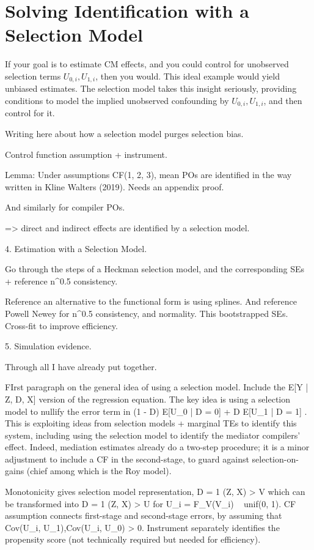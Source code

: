 \section{Solving Identification with a Selection Model}
\label{sec:selectionmodel}
If your goal is to estimate CM effects, and you could control for unobserved selection terms $U_{0,i}, U_{1,i}$, then you would.
This ideal example would yield unbiased estimates.
The selection model takes this insight seriously, providing conditions to model the implied unobserved confounding by $U_{0,i}, U_{1,i}$, and then control for it.

Writing here about how a \cite{heckman1974shadow} selection model purges selection bias.



Control function assumption + instrument.

Lemma: Under assumptions CF(1, 2, 3), mean POs are identified in the way written in Kline Walters (2019).
Needs an appendix proof.

And similarly for compiler POs.

=> direct and indirect effects are identified by a selection model.

4. Estimation with a Selection Model.

Go through the steps of a Heckman selection model,  and the corresponding SEs + reference n^0.5 consistency.

Reference an alternative to the functional form is using splines.  And reference Powell Newey for n^0.5 consistency, and normality.  This bootstrapped SEs.  Cross-fit to improve efficiency.

5. Simulation evidence.

Through all I have already put together.

FIrst paragraph on the general idea of using a selection model.  Include the E[Y | Z, D, X] version of the regression equation.
The key idea is using a selection model to nullify the error term in (1 - D) E[U_0 | D = 0] + D E[U_1 | D = 1] .  This is exploiting ideas from selection models + marginal TEs to identify this system, including using the selection model to identify the mediator compilers’ effect.  Indeed, mediation estimates already do a two-step procedure; it is a minor adjustment to include a CF  in the second-stage, to guard against selection-on-gains (chief among which is the Roy model).

Monotonicity gives selection model representation, D = 1{ \phi(Z, X) > V } which can be transformed into D = 1{ \pi(Z, X) > U } for U_i = F_V(V_i) ~ unif(0, 1).
CF assumption connects first-stage and second-stage errors, by assuming that Cov(U_i, U_1),Cov(U_i, U_0)  > 0.
Instrument separately identifies the propensity score (not technically required but needed for efficiency).

